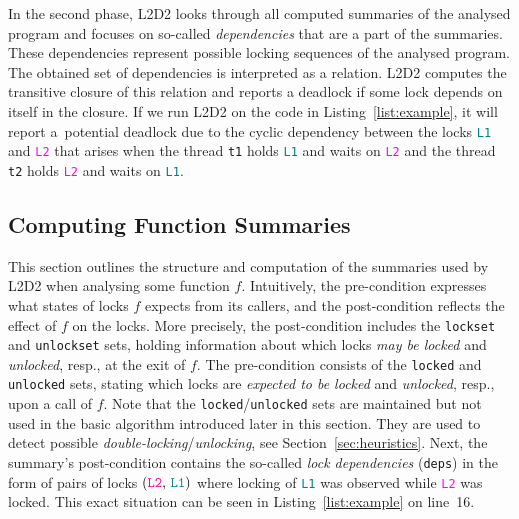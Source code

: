 \documentclass[runningheads]{llncs}
\newcommand{\LLDD}{\textsc{L2D2}\xspace} %
\begin{document}
In the second phase, \LLDD looks through all computed summaries of the analysed
program and focuses on so-called \emph{dependencies} that are a part of the
summaries. These dependencies represent possible locking sequences of the
analysed program. The obtained set of dependencies is interpreted as a relation.
\LLDD computes the transitive closure of this relation and reports a deadlock if
some lock depends on itself in the closure. If we run \LLDD on the code in
Listing~\ref{list:example}, it will report a~potential deadlock due to the
cyclic dependency between the locks \texttt{\textcolor{teal}{L1}} and
\texttt{\textcolor{magenta}{L2}} that arises when the thread \texttt{t1} holds
\texttt{\textcolor{teal}{L1}} and waits on \texttt{\textcolor{magenta}{L2}} and
the thread \texttt{t2} holds \texttt{\textcolor{magenta}{L2}} and waits on
\texttt{\textcolor{teal}{L1}}.

\vspace*{-4mm}\subsection{Computing Function Summaries}\vspace*{-2mm}
\label{sec:summaries}

This section outlines the structure and computation of the summaries used by
\LLDD when analysing some function $f$. Intuitively, the pre-condition expresses
what states of locks $f$ expects from its callers, and the post-condition
reflects the effect of $f$ on the locks. More precisely, the post-condition
includes the \texttt{lockset} and \texttt{unlockset} sets, holding information
about which locks \emph{may be locked} and \emph{unlocked}, resp., at the exit
of $f$. The pre-condition consists of the \texttt{locked} and \texttt{unlocked}
sets, stating which locks are \emph{expected to be locked} and \emph{unlocked},
resp., upon a call of $f$. Note that the \texttt{locked}/\texttt{unlocked} sets
are maintained but not used in the basic algorithm introduced later in this
section. They are used to detect possible
\emph{double-locking}/\emph{unlocking}, see Section~\ref{sec:heuristics}. Next,
the summary's post-condition contains the so-called \emph{lock dependencies}
(\texttt{deps}) in the form of pairs of locks
$(\text{\texttt{\textcolor{magenta}{L2}}, \texttt{\textcolor{teal}{L1}}})$ where
locking of \texttt{\textcolor{teal}{L1}} was observed while
\texttt{\textcolor{magenta}{L2}} was locked. This exact situation can be seen in
Listing~\ref{list:example} on line~16.
\end{document}
